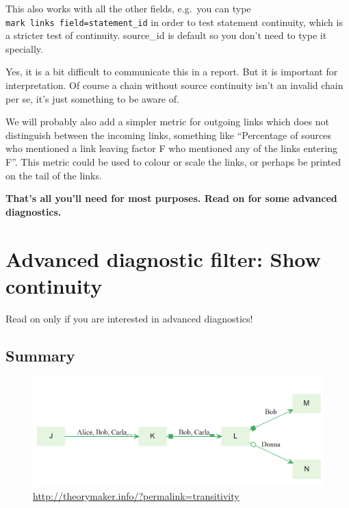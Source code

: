 \documentclass[
]{book}
\begin{document}
This also works with all the other fields, e.g.~you can type \texttt{mark\ links\ field=statement\_id} in order to test statement continuity, which is a stricter test of continuity. source\_id is default so you don't need to type it specially.

Yes, it is a bit difficult to communicate this in a report. But it is important for interpretation. Of course a chain without source continuity isn't an invalid chain per se, it's just something to be aware of.

We will probably also add a simpler metric for outgoing links which does not distinguish between the incoming links, something like ``Percentage of sources who mentioned a link leaving factor F who mentioned any of the links entering F''. This metric could be used to colour or scale the links, or perhaps be printed on the tail of the links.

\textbf{That's all you'll need for most purposes. Read on for some advanced diagnostics.}

\hypertarget{advanced-diagnostic-filter-show-continuity}{%
\section{Advanced diagnostic filter: Show continuity}\label{advanced-diagnostic-filter-show-continuity}}

Read on only if you are interested in advanced diagnostics!

\hypertarget{summary-8}{%
\subsection{Summary}\label{summary-8}}

\begin{figure}
\centering
\includegraphics[width=6.77083in,height=\textheight]{_assets/image-20211222121147473.png}
\caption{\url{http://theorymaker.info/?permalink=transitivity}}
\end{figure}
\end{document}
